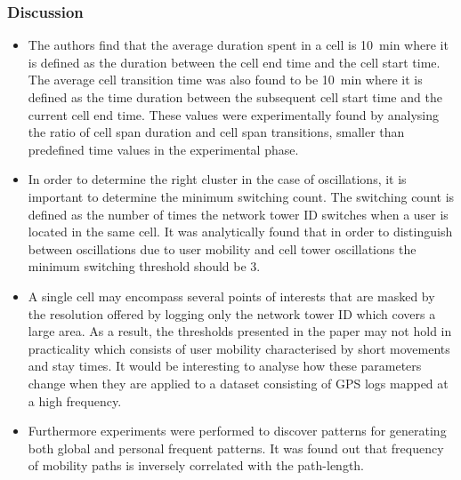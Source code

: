 \subsubsection*{Discussion}

\begin{itemize} 

	\item The authors find that the average duration spent in a cell is 10~min where it is 
	defined as the duration between the cell end time and the cell start time. The average
	cell transition time was also found to be 10~min where it is defined as the time duration
	between the subsequent cell start time and the current cell end time. These values were 
	experimentally found by analysing the ratio of cell span duration and cell span transitions,
	smaller than predefined time values in the experimental phase. 
	
	\item In order to determine the right cluster in the case of oscillations, it is important
	to determine the minimum switching count. The switching count is defined as the number 
	of times the network tower ID switches when a user is located in the same cell. It was 
	analytically found that in order to 	distinguish between oscillations due to user mobility 
	and cell tower oscillations the 	minimum switching threshold should be 3. 
		
	\item A single cell may encompass several points of interests that are masked by the resolution 
	offered by logging only the network tower ID which covers a large area. As a result, the thresholds 
	presented in the paper may not hold in practicality which consists of user mobility characterised 
	by short movements and stay times. It would be interesting to analyse how these parameters change 
	when they are applied to a dataset consisting of GPS logs mapped at a high frequency.
	
	\item Furthermore experiments were performed to discover patterns for generating both global
	and personal frequent patterns. It was found out that frequency 	of mobility paths is inversely
	correlated with the path-length. 
	
\end{itemize}

